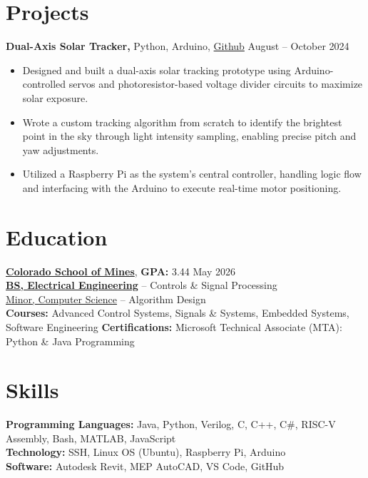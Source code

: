 \documentclass[11pt]{article}       %
\begin{document}
\vspace{-18pt}
\section*{Projects}
\vspace{5pt}

\textbf{Dual-Axis Solar Tracker, }{Python, Arduino, \href{https://github.com/edwardasilva/SolarPanelProject}{Github}} \hfill{August -- October 2024} \\
\vspace{-6.5pt}
\begin{itemize}
  \item Designed and built a dual-axis solar tracking prototype using Arduino-controlled servos and photoresistor-based voltage divider circuits to maximize solar exposure.
  \item Wrote a custom tracking algorithm from scratch to identify the brightest point in the sky through light intensity sampling, enabling precise pitch and yaw adjustments.
  \item Utilized a Raspberry Pi as the system's central controller, handling logic flow and interfacing with the Arduino to execute real-time motor positioning.
\end{itemize}


\vspace{-18 pt}
\section*{Education}
\vspace{5pt}

\textbf{\href{https://www.mines.edu/}{Colorado School of Mines}}, \textbf{GPA:} 3.44  \hfill May 2026\\
\textbf{\href{https://electrical.mines.edu/undergraduate-program/}{BS, Electrical Engineering}} -- Controls \& Signal Processing  \\
\href{https://cs.mines.edu/csmines-minors-and-areas-of-special-interest/}{Minor, Computer Science} -- Algorithm Design\\
\textbf{Courses:} Advanced Control Systems, Signals \& Systems, Embedded Systems, Software Engineering
\textbf{Certifications:} Microsoft Technical Associate (MTA): Python \& Java Programming

\section*{Skills}
\vspace{5pt}

\textbf{Programming Languages:} Java, Python, Verilog, C, C++, C\#, RISC-V Assembly, Bash, MATLAB, JavaScript \\
\textbf{Technology:} SSH, Linux OS (Ubuntu), Raspberry Pi, Arduino \\
\textbf{Software:} Autodesk Revit, MEP AutoCAD, VS Code, GitHub \\
\end{document}
